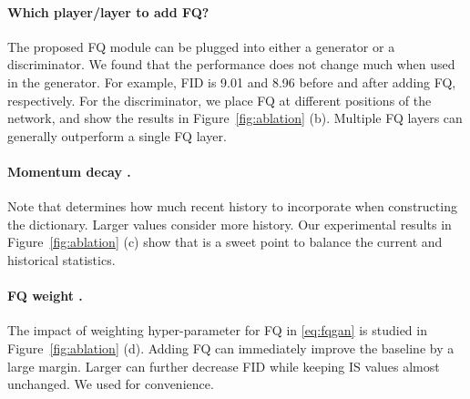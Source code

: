 \documentclass{article}
\begin{document}
\paragraph{Which player/layer to add FQ?} The proposed FQ module can be plugged into either a generator or a discriminator. We found that the performance does not change much when used in the generator. For example, FID is 9.01 {\scriptsize } and 8.96 {\scriptsize } before and after adding FQ, respectively. For the discriminator, we place FQ at different positions of the network, and show the results in Figure~\ref{fig:ablation} (b). Multiple FQ layers can generally outperform a single FQ layer. 



\paragraph{Momentum decay .} Note that  determines how much recent history to incorporate when constructing the dictionary. Larger values consider more history. Our experimental results in Figure~\ref{fig:ablation} (c) show that  is a sweet point to balance the current and historical statistics. 

\paragraph{FQ weight .} The impact of weighting hyper-parameter  for FQ in \eqref{eq:fqgan} is studied in Figure~\ref{fig:ablation} (d). Adding FQ can immediately improve the baseline by a large margin. Larger  can further decrease FID while keeping IS values almost unchanged. We used  for convenience. 
\end{document}
